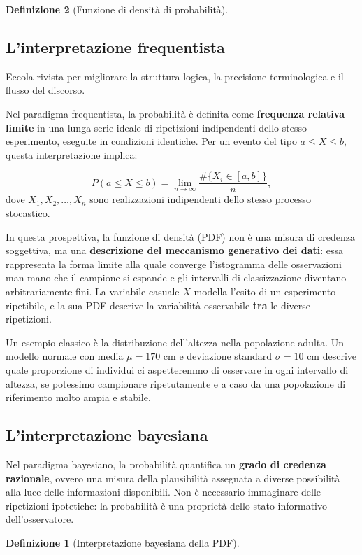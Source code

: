 \documentclass[
  italian,
  letterpaper,
  a4paper,
  11pt,
  open=any]{scrbook}
\theoremstyle{plain}
\theoremstyle{definition}
\theoremstyle{definition}
\newtheorem{definition}{Definizione}[chapter]
\theoremstyle{remark}
\begin{document}
\begin{definition}[Funzione di densità di
probabilità]
\subsection{L'interpretazione
frequentista}\label{linterpretazione-frequentista}

Eccola rivista per migliorare la struttura logica, la precisione
terminologica e il flusso del discorso.

Nel paradigma frequentista, la probabilità è definita come
\textbf{frequenza relativa limite} in una lunga serie ideale di
ripetizioni indipendenti dello stesso esperimento, eseguite in
condizioni identiche. Per un evento del tipo \(a \leq X \leq b\), questa
interpretazione implica:

\[
P(a \leq X \leq b) = \lim_{n \to \infty} \frac{\#\{X_i \in [a,b]\}}{n},
\] dove \(X_1, X_2, \ldots, X_n\) sono realizzazioni indipendenti dello
stesso processo stocastico.

In questa prospettiva, la funzione di densità (PDF) non è una misura di
credenza soggettiva, ma una \textbf{descrizione del meccanismo
generativo dei dati}: essa rappresenta la forma limite alla quale
converge l'istogramma delle osservazioni man mano che il campione si
espande e gli intervalli di classizzazione diventano arbitrariamente
fini. La variabile casuale \(X\) modella l'esito di un esperimento
ripetibile, e la sua PDF descrive la variabilità osservabile
\textbf{tra} le diverse ripetizioni.

Un esempio classico è la distribuzione dell'altezza nella popolazione
adulta. Un modello normale con media \(\mu = 170\) cm e deviazione
standard \(\sigma = 10\) cm descrive quale proporzione di individui ci
aspetteremmo di osservare in ogni intervallo di altezza, se potessimo
campionare ripetutamente e a caso da una popolazione di riferimento
molto ampia e stabile.

\subsection{L'interpretazione
bayesiana}\label{linterpretazione-bayesiana}

Nel paradigma bayesiano, la probabilità quantifica un \textbf{grado di
credenza razionale}, ovvero una misura della plausibilità assegnata a
diverse possibilità alla luce delle informazioni disponibili. Non è
necessario immaginare delle ripetizioni ipotetiche: la probabilità è una
proprietà dello stato informativo dell'osservatore.

\begin{definition}[Interpretazione bayesiana della
PDF]\protect\hypertarget{def-bayesian-pdf}{}\label{def-bayesian-pdf}


\end{definition}
\end{definition}
\end{document}
